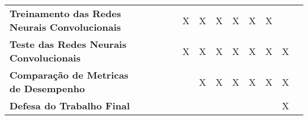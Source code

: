 \begin{table}[ht]
\begin{center}
\begin{small}
\begin{tabular}{p{5cm}cccccccccccc}
  \textbf{Treinamento das
  Redes Neurais Convolucionais}         &             &             &             &             &      X      &      X      &      X      &      X      &      X      &      X       &            \\
  \textbf{Teste das Redes
  Neurais Convolucionais}               &             &             &             &             &      X      &      X      &      X      &      X      &      X      &      X       &     X      \\
  \textbf{Comparação de Metricas
  de Desempenho}                        &             &             &             &             &             &      X      &      X      &      X      &      X      &      X      &      X      \\
  \textbf{Defesa do Trabalho Final}     &             &             &             &             &             &             &             &             &             &             &      X      \\
  \bottomrule
\end{tabular}
\end{small}
\end{center}
\end{table}
